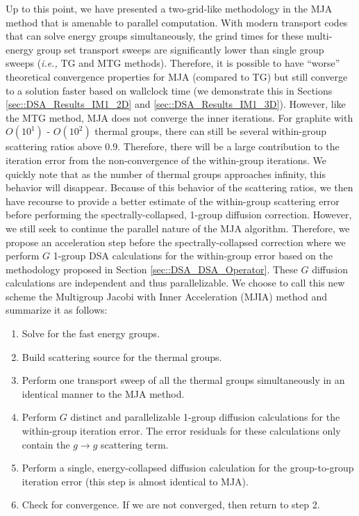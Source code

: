Up to this point, we have presented a two-grid-like methodology in the MJA method that is amenable to parallel computation. With modern transport codes that can solve energy groups simultaneously, the grind times for these multi-energy group set transport sweeps are significantly lower than single group sweeps ({\em i.e.,} TG and MTG methods). Therefore, it is possible to have ``worse'' theoretical convergence properties for MJA (compared to TG) but still converge to a solution faster based on wallclock time (we demonstrate this in Sections \ref{sec::DSA_Results_IM1_2D} and \ref{sec::DSA_Results_IM1_3D}). However, like the MTG method, MJA does not converge the inner iterations. For graphite with $O(10^1)$ - $O(10^2)$ thermal groups, there can still be several within-group scattering ratios above 0.9. Therefore, there will be a large contribution to the iteration error from the non-convergence of the within-group iterations. We quickly note that as the number of thermal groups approaches infinity, this behavior will disappear. Because of this behavior of the scattering ratios, we then have recourse to provide a better estimate of the within-group scattering error before performing the spectrally-collapsed, 1-group diffusion correction. However, we still seek to continue the parallel nature of the MJA algorithm. Therefore, we propose an acceleration step before the spectrally-collapsed correction where we perform $G$ 1-group DSA calculations for the within-group error based on the methodology proposed in Section \ref{sec::DSA_DSA_Operator}. These $G$ diffusion calculations are independent and thus parallelizable. We choose to call this new scheme the Multigroup Jacobi with Inner Acceleration (MJIA) method and summarize it as follows:

\begin{enumerate}
\item Solve for the fast energy groups.
\item Build scattering source for the thermal groups.
\item Perform one transport sweep of all the thermal groups simultaneously in an identical manner to the MJA method.
\item Perform $G$ distinct and parallelizable 1-group diffusion calculations for the within-group iteration error. The error residuals for these calculations only contain the $g\rightarrow g$ scattering term.
\item Perform a single, energy-collapsed diffusion calculation for the group-to-group iteration error (this step is almost identical to MJA).
\item Check for convergence. If we are not converged, then return to step 2.
\end{enumerate}

